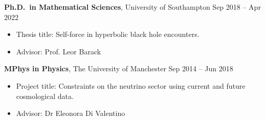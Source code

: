 \documentclass[10.5pt, oneside]{article}   	%
\begin{document}
\textbf{Ph.D.\ in Mathematical Sciences}, University of Southampton \hfill Sep 2018 -- Apr 2022 \\
\vspace{-5mm}
\begin{itemize}
\item Thesis title: Self-force in hyperbolic black hole encounters.
\item Advisor: Prof. Leor Barack
\end{itemize}
\textbf{MPhys in Physics}, The University of Manchester \hfill Sep 2014 -- Jun 2018 \\
\vspace{-5mm}
\begin{itemize}
\item Project title: Constraints on the neutrino sector using current and future cosmological data.
\item Advisor: Dr Eleonora Di Valentino
\end{itemize}

\end{document}
